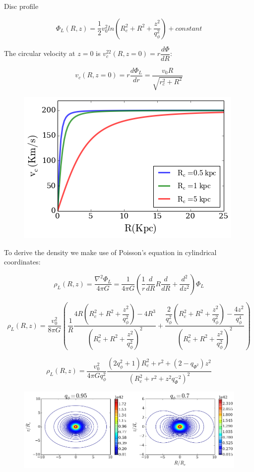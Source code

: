 Disc profile

\begin{equation}
\Phi_L(R, z) = \dfrac{1}{2} v_0^2 ln \left( R_c^2 + R^2 + \dfrac{z^2}{q_{\phi}^2}  \right) + constant
\end{equation}

The circular velocity at $z=0$ is $v_c^22(R, z=0) = r \dfrac{d \Phi}{dR}$:

\begin{equation}
v_c(R, z=0) = r \dfrac{d \Phi_L}{dr} = \dfrac{v_0 R}{\sqrt{r_c^2 + R^2}}
\end{equation}

\begin{figure}[H]
\centering
\includegraphics[scale=0.7]{../figures/Log_vc.png}
\end{figure}


To derive the density we make use of Poisson's equation in cylindrical coordinates:

\begin{equation}
\rho_L(R, z) = \dfrac{\nabla^2 \Phi_L}{4 \pi G } = \dfrac{1}{4 \pi G} \left( \dfrac{1}{r}\dfrac{d}{dR}R\dfrac{d}{dR}  + \dfrac{d^2}{dz^2}  \right) \Phi_L
\end{equation}

\begin{equation}
\rho_L(R, z) = \dfrac{v_0^2}{8 \pi G } \left( \dfrac{1}{R} \dfrac{4R ( R_c^2 + R^2 + \dfrac{z^2}{q_{\phi}^2} ) - 4R^3}{( R_c^2 + R^2 + \dfrac{z^2}{q_{\phi}^2} )^2} + \dfrac{\dfrac{2}{q_{\phi}^2} ( R_c^2 + R^2 + \dfrac{z^2}{q_{\phi}^2} ) - \dfrac{4z^2}{q_{\phi}^4}}{( R_c^2 + R^2 + \dfrac{z^2}{q_{\phi}^2} )^2}  \right)
\end{equation}

\begin{equation}
\rho_L(R, z) =  \dfrac{v_0^2}{4 \pi G q_{\phi}^2} \dfrac{(2q_{\phi}^2 + 1)R_c^2 + r^2 + (2 - q_{\Phi^2})z^2}{(R_c^2 + r^2 + z^2q_{\Phi}^{-2})^2}
\end{equation}


\begin{figure}[H]
\centering
\includegraphics[scale=0.6]{../figures/MN_logarithmic_contours.png}
\end{figure}

